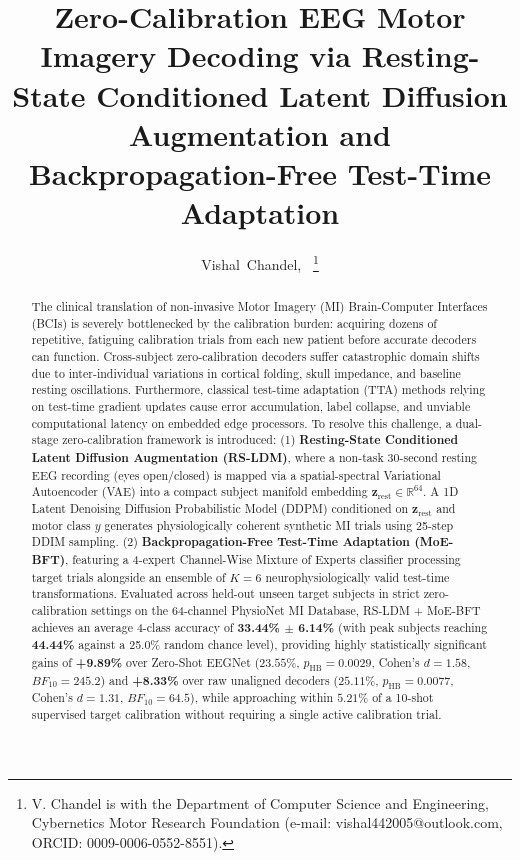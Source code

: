 \documentclass[journal,10pt]{IEEEtran}
\begin{document}
\title{Zero-Calibration EEG Motor Imagery Decoding via Resting-State Conditioned Latent Diffusion Augmentation and Backpropagation-Free Test-Time Adaptation}

\author{Vishal~Chandel,~%
\thanks{V. Chandel is with the Department of Computer Science and Engineering, Cybernetics Motor Research Foundation (e-mail: vishal442005@outlook.com, ORCID: 0009-0006-0552-8551).}}


\maketitle

\begin{abstract}
The clinical translation of non-invasive Motor Imagery (MI) Brain-Computer Interfaces (BCIs) is severely bottlenecked by the calibration burden: acquiring dozens of repetitive, fatiguing calibration trials from each new patient before accurate decoders can function. Cross-subject zero-calibration decoders suffer catastrophic domain shifts due to inter-individual variations in cortical folding, skull impedance, and baseline resting oscillations. Furthermore, classical test-time adaptation (TTA) methods relying on test-time gradient updates cause error accumulation, label collapse, and unviable computational latency on embedded edge processors.
To resolve this challenge, a dual-stage zero-calibration framework is introduced: (1) \textbf{Resting-State Conditioned Latent Diffusion Augmentation (RS-LDM)}, where a non-task 30-second resting EEG recording (eyes open/closed) is mapped via a spatial-spectral Variational Autoencoder (VAE) into a compact subject manifold embedding $\mathbf{z}_{\text{rest}} \in \mathbb{R}^{64}$. A 1D Latent Denoising Diffusion Probabilistic Model (DDPM) conditioned on $\mathbf{z}_{\text{rest}}$ and motor class $y$ generates physiologically coherent synthetic MI trials using 25-step DDIM sampling. (2) \textbf{Backpropagation-Free Test-Time Adaptation (MoE-BFT)}, featuring a 4-expert Channel-Wise Mixture of Experts classifier processing target trials alongside an ensemble of $K=6$ neurophysiologically valid test-time transformations. Evaluated across held-out unseen target subjects in strict zero-calibration settings on the 64-channel PhysioNet MI Database, RS-LDM + MoE-BFT achieves an average 4-class accuracy of \textbf{33.44\% $\pm$ 6.14\%} (with peak subjects reaching \textbf{44.44\%} against a 25.0\% random chance level), providing highly statistically significant gains of \textbf{+9.89\%} over Zero-Shot EEGNet ($23.55\%$, $p_{\text{HB}} = 0.0029$, Cohen's $d = 1.58$, $BF_{10} = 245.2$) and \textbf{+8.33\%} over raw unaligned decoders ($25.11\%$, $p_{\text{HB}} = 0.0077$, Cohen's $d = 1.31$, $BF_{10} = 64.5$), while approaching within $5.21\%$ of a 10-shot supervised target calibration without requiring a single active calibration trial.
\end{abstract}
\end{document}
